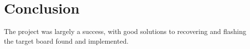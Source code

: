 \clearpage%
\vspace{21.5pt}
\chapter{Conclusion}

The project was largely a success, with good solutions to recovering and flashing the target board found and implemented.